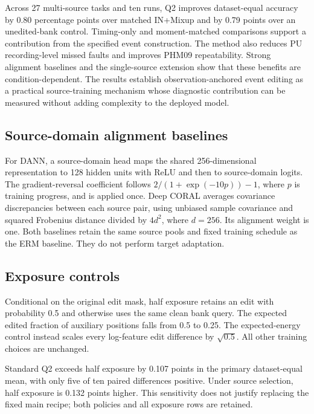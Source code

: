 \documentclass[a4paper,fleqn]{cas-sc}
\begin{document}
Across 27 multi-source tasks and ten runs, Q2 improves dataset-equal accuracy by 0.80 percentage points over matched IN+Mixup and by 0.79 points over an unedited-bank control. Timing-only and moment-matched comparisons support a contribution from the specified event construction. The method also reduces PU recording-level missed faults and improves PHM09 repeatability. Strong alignment baselines and the single-source extension show that these benefits are condition-dependent. The results establish observation-anchored event editing as a practical source-training mechanism whose diagnostic contribution can be measured without adding complexity to the deployed model.

\appendix
\FloatBarrier

\subsection{Source-domain alignment baselines}
For DANN, a source-domain head maps the shared 256-dimensional representation to 128 hidden units with ReLU and then to source-domain logits. The gradient-reversal coefficient follows $2/(1+\exp(-10p))-1$, where $p$ is training progress, and is applied once. Deep CORAL averages covariance discrepancies between each source pair, using unbiased sample covariance and squared Frobenius distance divided by $4d^2$, where $d=256$. Its alignment weight is one. Both baselines retain the same source pools and fixed training schedule as the ERM baseline. They do not perform target adaptation.

\subsection{Exposure controls}
Conditional on the original edit mask, half exposure retains an edit with probability 0.5 and otherwise uses the same clean bank query. The expected edited fraction of auxiliary positions falls from 0.5 to 0.25. The expected-energy control instead scales every log-feature edit difference by $\sqrt{0.5}$. All other training choices are unchanged.

Standard Q2 exceeds half exposure by 0.107 points in the primary dataset-equal mean, with only five of ten paired differences positive. Under source selection, half exposure is 0.132 points higher. This sensitivity does not justify replacing the fixed main recipe; both policies and all exposure rows are retained.

\FloatBarrier
\end{document}
